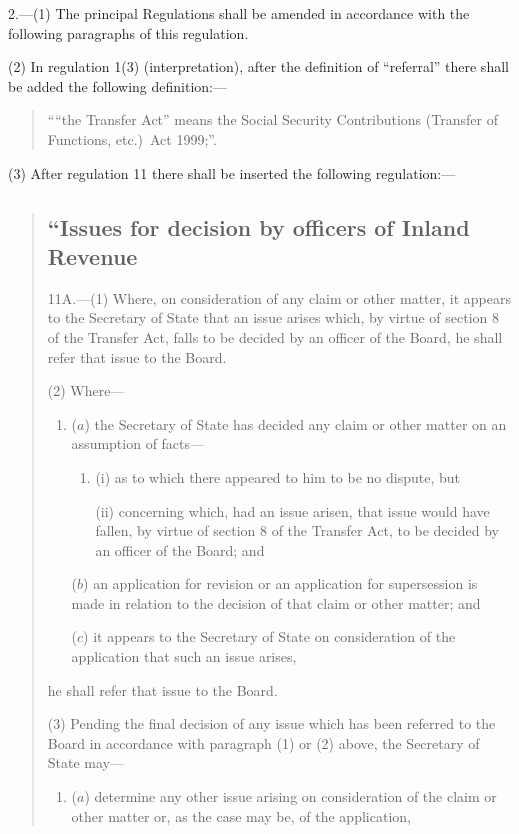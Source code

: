 \documentclass[12pt,a4paper]{article}
\begin{document}
2.---(1)  The principal Regulations shall be amended in accordance with the following paragraphs of this regulation.

(2) In regulation 1(3) (interpretation), after the definition of “referral” there shall be added the following definition:—
\begin{quotation}
““the Transfer Act” means the Social Security Contributions (Transfer of Functions, etc.)\ Act 1999;”.
\end{quotation}

(3) After regulation 11 there shall be inserted the following regulation:—
\begin{quotation}
\subsection*{“Issues for decision by officers of Inland Revenue}

11A.---(1)  Where, on consideration of any claim or other matter, it appears to the Secretary of State that an issue arises which, by virtue of section 8 of the Transfer Act, falls to be decided by an officer of the Board, he shall refer that issue to the Board.

(2) Where—
\begin{enumerate}\item[]
($a$) the Secretary of State has decided any claim or other matter on an assumption of facts—
\begin{enumerate}\item[]
(i) as to which there appeared to him to be no dispute, but

(ii) concerning which, had an issue arisen, that issue would have fallen, by virtue of section 8 of the Transfer Act, to be decided by an officer of the Board; and
\end{enumerate}

($b$) an application for revision or an application for supersession is made in relation to the decision of that claim or other matter; and

($c$) it appears to the Secretary of State on consideration of the application that such an issue arises,
\end{enumerate}
he shall refer that issue to the Board.

(3) Pending the final decision of any issue which has been referred to the Board in accordance with paragraph (1) or (2) above, the Secretary of State may—
\begin{enumerate}\item[]
($a$) determine any other issue arising on consideration of the claim or other matter or, as the case may be, of the application,


\end{enumerate}
\end{quotation}
\end{document}
